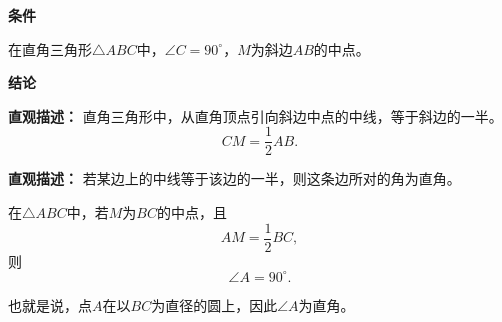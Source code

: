 \begin{statementbox}
	\textbf{\textcolor{CStatement}{条件}}
	\begin{description}[style=nextline, leftmargin=2.8em, labelsep=0.5em, itemsep=0.35em]
		\item[\textbf{\textcolor{CStatement}{条件1（直角三角形与斜边中点）：}}] 在直角三角形$\triangle ABC$中，$\angle C=90^\circ$，$M$为斜边$AB$的中点。
	\end{description}

	\textbf{\textcolor{CStatement}{结论}}
	\begin{description}[style=nextline, leftmargin=2.8em, labelsep=0.5em, itemsep=0.45em]
		\item[\textbf{\textcolor{CStatement}{结论一（中线长度）：}}]
		      \textbf{\textcolor{CStatement}{直观描述：}} 直角三角形中，从直角顶点引向斜边中点的中线，等于斜边的一半。
		      \[
			      CM = \frac{1}{2}AB.
		      \]

		\item[\textbf{\textcolor{CStatement}{推广结论（逆定理）：}}]
		      \textbf{\textcolor{CStatement}{直观描述：}} 若某边上的中线等于该边的一半，则这条边所对的角为直角。

		      在$\triangle ABC$中，若$M$为$BC$的中点，且
		      \[
			      AM = \frac12 BC,
		      \]
		      则
		      \[
			      \angle A = 90^\circ.
		      \]

		      也就是说，点$A$在以$BC$为直径的圆上，因此$\angle A$为直角。
	\end{description}
\end{statementbox}
